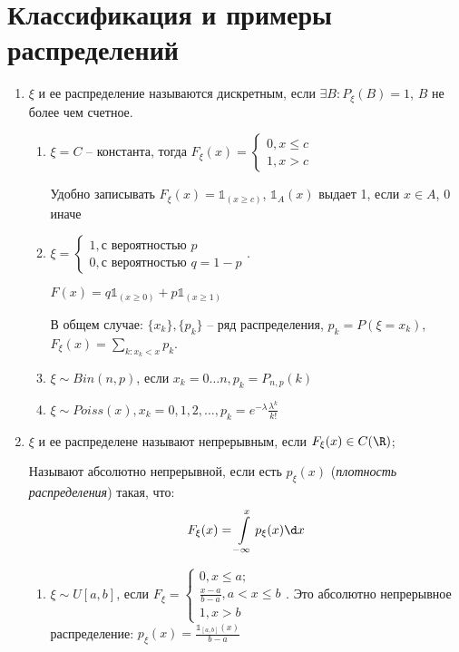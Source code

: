 \section{Классификация и примеры распределений}
\begin{enumerate}[label=\Roman*.]
    \item $\xi$ и ее распределение называются дискретным, если $\exists B\colon P_{\xi}(B) = 1$, $B$ не более чем счетное.
    \begin{enumerate}[label=\arabic*.]
    \item $\xi = C$ -- константа, тогда $F_{\xi}(x) = \begin{cases} 0, x \leq c \\ 1, x > c\end{cases}$
    \begin{Rem}
        Удобно записывать $F_{\xi}(x) = \mathbb{1}_{(x \geq c)}$, $\mathbb{1}_A (x)$ выдает 1, если $x \in A$, 0 иначе
    \end{Rem}   
    \item $\xi = \begin{cases} 1, \text{с вероятностью } p \\ 0, \text{с вероятностью } q = 1 - p\end{cases}$.

    $F(x) = q \mathbb{1}_{(x \geq 0)} + p \mathbb{1}_{(x \geq 1)}$

    В общем случае: $\{x_k\}, \{p_k\}$ -- ряд распределения, $p_k = P(\xi = x_k)$, $F_{\xi}(x) = \sum\limits_{k\colon x_k < x} p_k$.

    \item
    $\xi \sim Bin(n, p)$, если $x_k = 0 \dots n, p_k = P_{n,p}(k)$

    \item
    $\xi \sim Poiss(x), x_k = 0, 1, 2, \dots, p_k = e^{-\lambda} \frac{\lambda^k}{k!}$
    \end{enumerate}
    \item
    \begin{Def}
    $\xi$ и ее распределене называют непрерывным, если $F_{\xi}(x) \in C(\R)$; 
    \end{Def}
    
    \begin{Def}
    Называют абсолютно непрерывной, если есть $p_{\xi}(x)$ (\textit{плотность распределения}) такая, что:
    \[ F_{\xi}(x) =\int\limits_{-\infty}^{x} p_{\xi}(x) \d x\]
    \end{Def}

    \begin{enumerate}[label=\arabic*.]
    \item
        $\xi \sim U[a, b]$, если
        $F_{\xi} = \begin{cases}
            0, x \leq a; \\
            \frac{x - a}{b - a}, a < x \leq b \\
            1, x > b\end{cases}$.
        Это абсолютно непрерывное распределение:
        $p_{\xi}(x) = \frac{\mathbb{1}_{[a, b]}(x)}{b - a}$


\end{enumerate}
\end{enumerate}
